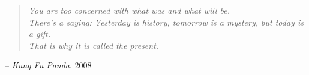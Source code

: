\begin{titlepage}
\nonumber
\null {}
	\begin{flushright}
	\begin{verse}
\textit{You are too concerned with what was and what will be. \\
There's a saying: Yesterday is history, tomorrow is a mystery, but today is a gift.\\
That is why it is called the present.} \\[5mm]
	\end{verse}
	-- \textit{Kung Fu Panda}, 2008
	\end{flushright}
\end{titlepage}